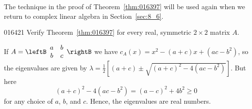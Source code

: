 \noindent The technique in the proof of Theorem~\ref{thm:016397} will be used again when we return to complex linear algebra in Section~\ref{sec:8_6}.

\begin{example}{}{016421}
Verify Theorem~\ref{thm:016397} for every real, symmetric $2 \times 2$ matrix $A$.

\begin{solution}
If $A = 
\leftB \begin{array}{cc}
a & b \\
b & c
\end{array} \rightB$ we have $c_{A}(x) = x^{2} - (a + c)x + (ac - b^{2})$, so the eigenvalues are given by $\lambda = \frac{1}{2} [(a + c) \pm \sqrt{(a + c)^2 - 4(ac - b^2)}]$. But here
\begin{equation*}
(a + c)^2 - 4(ac -b^2) = (a - c)^2 + 4b^2 \geq 0
\end{equation*}
for any choice of $a$, $b$, and $c$. Hence, the eigenvalues are real numbers.
\end{solution}
\end{example}
